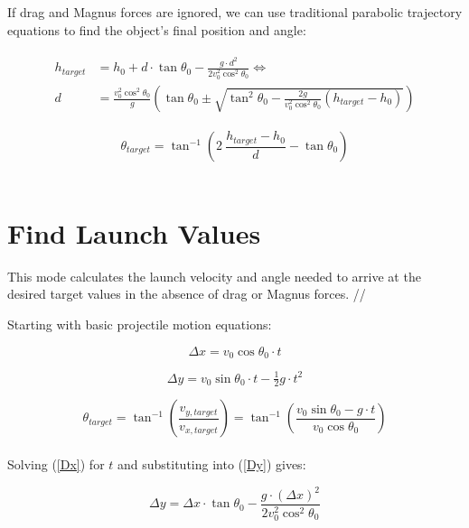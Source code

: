 \documentclass[a4paper]{article}
\begin{document}
	If drag and Magnus forces are ignored, we can use traditional parabolic trajectory equations to find the object's final position and angle:
	
	\begin{gather}
	\begin{aligned}
		h_{target} &= h_0 + d \cdot \tan \theta_0 - \frac{g \cdot d^2}{2 v_0^2 \cos^2 \theta_0} \iff \\
		d &= \frac{v_0^2 \cos^2 \theta_0}{g} \left( \tan \theta_0 \pm \sqrt{\tan^2 \theta_0 - \frac{2g}{v_0^2 \cos^2 \theta_0} \left( h_{target} - h_0 \right) } \right)
	\end{aligned}
	\end{gather}
	
	\begin{equation}
		\theta_{target} = \tan^{-1} \left( 2\ \frac{h_{target} - h_0}{d} - \tan \theta_0 \right)
	\end{equation}\\
	
	
	\section*{Find Launch Values}
	
	This mode calculates the launch velocity and angle needed to arrive at the desired target values in the absence of drag or Magnus forces. //
	
	Starting with basic projectile motion equations:
	
	\begin{equation} \label{Dx}
		\Delta x = v_0 \cos \theta_0 \cdot t
	\end{equation}
	
	\begin{equation} \label{Dy}
		\Delta y = v_0 \sin \theta_0 \cdot t - \tfrac{1}{2} g \cdot t^2
	\end{equation}
	
	\begin{equation} \label{th_target}
		\theta_{target} = \tan^{-1} \left( \frac{v_{y, target}}{v_{x, target}} \right) = \tan^{-1} \left( \frac{v_0 \sin \theta_0 - g \cdot t}{v_0 \cos \theta_0} \right)
	\end{equation}\\
	
	Solving (\ref{Dx}) for $ t $ and substituting into (\ref{Dy}) gives:
	
	\begin{equation}
		\Delta y = \Delta x \cdot \tan \theta_0 - \frac{g \cdot \left( \Delta x \right)^2}{2 v_0^2 \cos^2 \theta_0}
	\end{equation}\\
	
\end{document}
